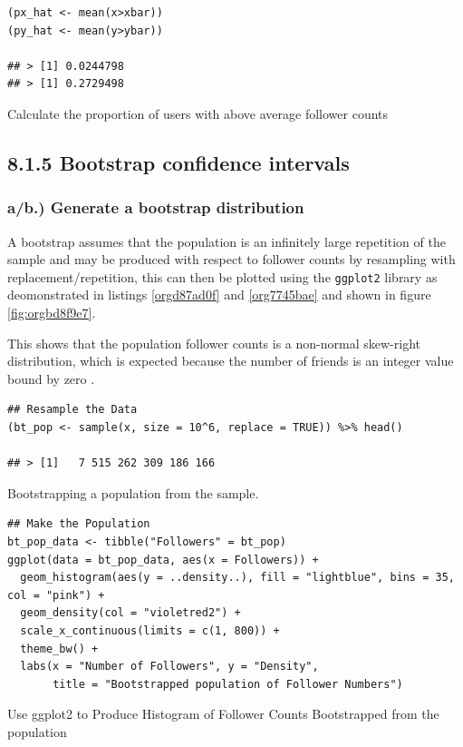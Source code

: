 \documentclass[11pt]{article}
\begin{document}
\begin{listing}[htbp]
\begin{verbatim}
(px_hat <- mean(x>xbar))
(py_hat <- mean(y>ybar))

## > [1] 0.0244798
## > [1] 0.2729498
\end{verbatim}
\caption{\label{orgca09d32}Calculate the proportion of users with above average follower counts}
\end{listing}


\subsection{8.1.5 Bootstrap confidence intervals}
\label{sec:org51ca1ac}
\subsubsection{a/b.) Generate a bootstrap distribution}
\label{sec:orgc840798}

A bootstrap assumes that the population is an infinitely large repetition of the
sample and may be produced with respect to follower counts by resampling with
replacement/repetition, this can then be plotted using the \texttt{ggplot2} library as deomonstrated
in listings \ref{orgd87ad0f} and \ref{org7745bae} and shown in figure \ref{fig:orgbd8f9e7}.

This shows that the population follower counts is a non-normal skew-right
distribution, which is expected because the number of friends is an integer value bound by zero \cite{nist2013}.

\begin{listing}[htbp]
\begin{verbatim}
## Resample the Data
(bt_pop <- sample(x, size = 10^6, replace = TRUE)) %>% head()

## > [1]   7 515 262 309 186 166
\end{verbatim}
\caption{\label{orgd87ad0f}Bootstrapping a population from the sample.}
\end{listing}

\begin{listing}[htbp]
\begin{verbatim}
## Make the Population
bt_pop_data <- tibble("Followers" = bt_pop)
ggplot(data = bt_pop_data, aes(x = Followers)) +
  geom_histogram(aes(y = ..density..), fill = "lightblue", bins = 35, col = "pink") +
  geom_density(col = "violetred2") +
  scale_x_continuous(limits = c(1, 800)) +
  theme_bw() +
  labs(x = "Number of Followers", y = "Density",
       title = "Bootstrapped population of Follower Numbers")

\end{verbatim}
\caption{\label{org7745bae}Use ggplot2 to Produce Histogram of Follower Counts Bootstrapped from the population}
\end{listing}
\end{document}
